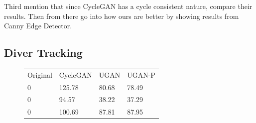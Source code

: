 \documentclass[conference,reqno]{IEEEtran}
\begin{document}
Third mention that since CycleGAN has a cycle consistent nature, compare their results. Then from there go into how
ours are better by showing results from Canny Edge Detector.


\subsection{Diver Tracking}

\begin{figure}
\centering
\begin{tabular}{p{1.7cm} p{1.7cm} p{1.7cm} p{1.5cm}}


   \small{Original} & \small{CycleGAN} & \small{UGAN} & \small{UGAN-P} \\

   0 & \small{125.78} & \small{80.68} & \small{78.49} \\

   0 & \small{94.57} & \small{38.22} & \small{37.29} \\

   0 & \small{100.69} & \small{87.81} & \small{87.95} \\
   

\end{tabular}
\end{figure}
\end{document}
